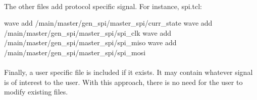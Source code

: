 \documentclass[12pt]{article}
\begin{document}
\paragraph{}
The other files add protocol specific signal. For instance, spi.tcl:
\begin{tcl}
wave add /main/master/gen_spi/master_spi/curr_state
wave add /main/master/gen_spi/master_spi/spi_clk
wave add /main/master/gen_spi/master_spi/spi_miso
wave add /main/master/gen_spi/master_spi/spi_mosi
\end{tcl}

\paragraph{}
Finally, a user specific file is included if it exists. It may contain
whatever signal is of interest to the user. With this approach, there
is no need for the user to modify existing files.
\end{document}
